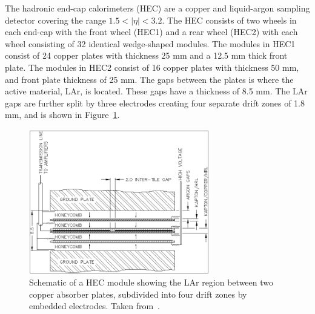 The hadronic end-cap calorimeters (HEC) are a copper and liquid-argon sampling detector covering the range $1.5 < |\eta| < 3.2$. The HEC consists of two wheels in each end-cap with the front wheel (HEC1) and a rear wheel (HEC2) with each wheel consisting of 32 identical wedge-shaped modules. The modules in HEC1 consist of 24 copper plates with thickness 25 mm and a 12.5 mm thick front plate. The modules in HEC2 consist of 16 copper plates with thickness 50 mm, and front plate thickness of 25 mm. The gaps between the plates is where the active material, LAr, is located. These gaps have a thickness of 8.5 mm. The LAr gaps are further split by three electrodes creating four separate drift zones of 1.8 mm, and is shown in Figure~\ref{fig:atlas_hcal_endcap_module}.

\begin{figure}[htp]
    \centering
    \includegraphics[width=0.7\textwidth]{figures/atlas/atlas_hcal_endcap_module.png}
    \caption{Schematic of a HEC module showing the LAr region between two copper absorber plates, subdivided into four drift zones by embedded electrodes. Taken from~\cite{atlas_collaboration_paper}.}\label{fig:atlas_hcal_endcap_module}
\end{figure}


